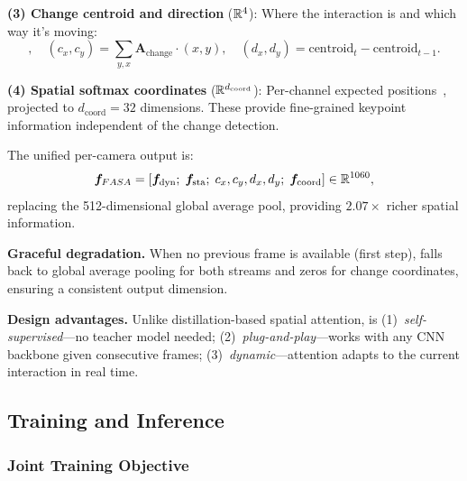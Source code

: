 \textbf{(3) Change centroid and direction} ($\mathbb{R}^4$): Where the interaction is and which way it's moving:
\begin{equation}
    [c_x, c_y, d_x, d_y], \quad (c_x, c_y) = \textstyle\sum_{y,x} \bm{A}_{\text{change}} \cdot (x,y), \quad (d_x, d_y) = \text{centroid}_t - \text{centroid}_{t-1}.
    \label{eq:change_coords}
\end{equation}

\textbf{(4) Spatial softmax coordinates} ($\mathbb{R}^{d_{\text{coord}}}$): Per-channel expected positions~\cite{levine2016end}, projected to $d_{\text{coord}} = 32$ dimensions. These provide fine-grained keypoint information independent of the change detection.

The unified per-camera output is:
\begin{equation}
    \bm{f}_{FASA{}} = [\bm{f}_{\text{dyn}};\; \bm{f}_{\text{sta}};\; c_x, c_y, d_x, d_y;\; \bm{f}_{\text{coord}}] \in \mathbb{R}^{1060},
    \label{eq:fasa_output}
\end{equation}
replacing the 512-dimensional global average pool, providing $2.07\times$ richer spatial information.

\textbf{Graceful degradation.} When no previous frame is available (first step), \fasa{} falls back to global average pooling for both streams and zeros for change coordinates, ensuring a consistent output dimension.

\textbf{Design advantages.} Unlike distillation-based spatial attention, \fasa{} is (1)~\emph{self-supervised}---no teacher model needed; (2)~\emph{plug-and-play}---works with any CNN backbone given consecutive frames; (3)~\emph{dynamic}---attention adapts to the current interaction in real time.

\subsection{Training and Inference}
\label{sec:training}

\subsubsection{Joint Training Objective}

